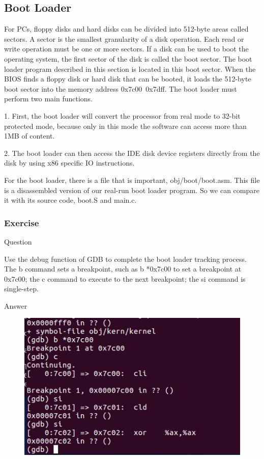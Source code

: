 \subsection{Boot Loader}
For PCs, floppy disks and hard disks can be divided into 512-byte areas called sectors. A sector is the smallest granularity of a disk operation. Each read or write operation must be one or more sectors. If a disk can be used to boot the operating system, the first sector of the disk is called the boot sector. The boot loader program described in this section is located in this boot sector. When the BIOS finds a floppy disk or hard disk that can be booted, it loads the 512-byte boot sector into the memory address 0x7c00~0x7dff.
The boot loader must perform two main functions.

 1. First, the boot loader will convert the processor from real mode to 32-bit protected mode, because only in this mode the software can access more than 1MB of content.

 2. The boot loader can then access the IDE disk device registers directly from the disk by using x86 specific IO instructions.

For the boot loader, there is a file that is important, obj/boot/boot.asm. This file is a disassembled version of our real-run boot loader program. So we can compare it with its source code, boot.S and main.c.
\subsubsection{Exercise }
\begin{flushleft}
{\Large Question}
\end{flushleft}

Use the debug function of GDB to complete the boot loader tracking process. The b command sets a breakpoint, such as b *0x7c00 to set a breakpoint at 0x7c00; the c command to execute to the next breakpoint; the si command is single-step.

\begin{flushleft}
{\Large Answer}
\end{flushleft}
\begin{figure}[H]
  \centering
  \includegraphics[width=0.8\linewidth]{figure/exercise_2}\\
\end{figure}

